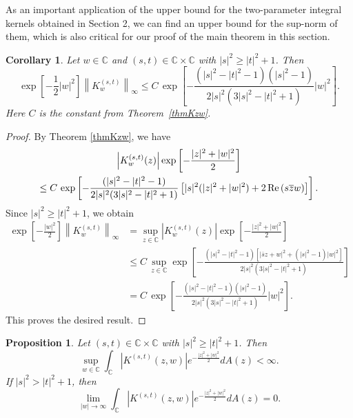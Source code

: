 \documentclass[reqno]{amsart}
\newtheorem{proposition}[theorem]{Proposition}
\newtheorem{corollary}[theorem]{Corollary}
\newcommand{\C}{{\mathbb C}}
\newcommand{\inc}{\int_{\C}}
\DeclareMathOperator{\re}{{\rm Re}\,}
\begin{document}
As an important application of the upper bound for the two-parameter
integral kernels obtained in Section 2, we can find an upper bound for
the sup-norm of them, which is also critical for our proof of the main 
theorem in this section.

\begin{corollary}\label{corSKinftymax}
Let $w\in\C$ and $(s, t)\in\C\times\C$ with $|s|^2\ge|t|^2+1$. Then
$$\exp\left[-\frac{1}{2}|w|^2\right]\left\|K^{(s,t)}_w\right\|_\infty
\leq C\, \exp\left[-\frac{(|s|^2-|t|^2-1)(|s|^2-1)}
{2|s|^2(3|s|^2-|t|^2+1)}|w|^2\right].$$
Here $C$ is the constant from Theorem~\ref{thmKzw}.
\end{corollary}

\begin{proof}
By Theorem \ref{thmKzw}, we have
\begin{multline*}
\left|K_w^{(s,t)}(z)\right|\exp \left[-\frac{|z|^2+|w|^2}{2}\right]\\
\leq C\,\exp\left[-\frac{(|s|^2-|t|^2-1)}{2|s|^2(3|s|^2-|t|^2+1)}
\left[|s|^2(|z|^2+|w|^2)+2\re ({s\overline{z}w})\right]\right].
\end{multline*}
Since $|s|^2\ge|t|^2+1$, we obtain
\begin{align*}
\exp\left[-\frac{|w|^2}{2}\right]\left\|K^{(s,t)}_w\right\|_\infty
&=\sup\limits_{z\in\C}\left|K_w^{(s,t)}(z)\right|
\exp\left[-\frac{|z|^2+|w|^2}{2}\right]\\
&\leq C\, \sup\limits_{z\in\C}\exp\left[-\frac{(|s|^2-|t|^2-1)
\left[|\overline{s}z+w|^2+(|s|^2-1)|w|^2\right]}
{2|s|^2(3|s|^2-|t|^2+1)}\right]\\
&= C\,\exp\left[-\frac{(|s|^2-|t|^2-1)(|s|^2-1)}
{2|s|^2(3|s|^2-|t|^2+1)}|w|^2\right].
\end{align*}
This proves the desired result.
\end{proof}


\begin{proposition}\label{propsup}
Let $(s, t)\in\C\times\C$ with $|s|^2\ge|t|^2+1$. Then
$$\sup_{w\in\C}\inc \left| K^{(s,t)}(z,w)\right|
e^{-\frac{|z|^2+|w|^2}{2}} dA(z)<\infty.$$
If $|s|^2>|t|^2+1$, then
$$\lim_{|w|\rightarrow\infty}\inc\left| K^{(s,t)}(z,w)\right|
e^{-\frac{|z|^2+|w|^2}{2}} dA(z)=0.$$
\end{proposition}
\end{document}
